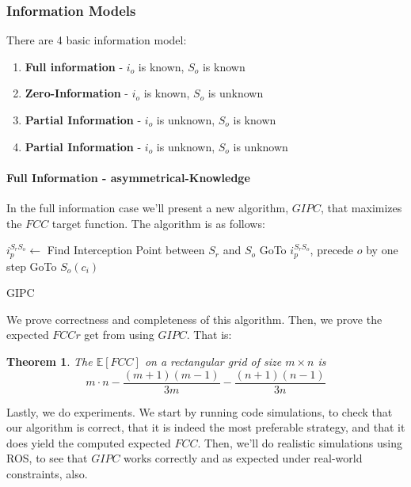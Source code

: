 \documentclass[a4paper,english,10pt]{article}
\newtheorem{theorem}{Theorem}[section]
\newcommand\rob{\ensuremath{r}\xspace}
\newcommand\opp{\ensuremath{o}\xspace}
\newcommand{\fcc}{\ensuremath{FCC}\xspace}
\begin{document}
\subsubsection{Information Models}
There are 4 basic information model: 
\begin{enumerate}
\item \textbf{Full information} - $i_\opp$ is known, $S_\opp$ is known
\item \textbf{Zero-Information} - $i_\opp$ is known, $S_\opp$ is unknown
\item \textbf{Partial Information} -  $i_\opp$ is unknown, $S_\opp$ is known
\item \textbf{Partial Information} - $i_\opp$ is unknown, $S_\opp$ is unknown
\end{enumerate}

\paragraph{Full Information - asymmetrical-Knowledge}

In the full information case we'll present a new algorithm, $GIPC$, that maximizes the \fcc target function.
The algorithm is as follows:
\begin{algorithm}
\begin{algorithmic}
	\STATE $i_p^{S_\rob S_\opp} \leftarrow $ Find Interception Point between $S_\rob$ and $S_\opp$
    \STATE GoTo $i_p^{S_\rob S_\opp}$, precede \opp by one step
    \LOOP
        	\STATE GoTo $S_\opp(c_i)$
        \ENDIF
    \ENDLOOP
  
\end{algorithmic}
\caption{GIPC\label{lss}}
\end{algorithm}

We prove correctness and completeness of this algorithm. Then, we prove the expected \fcc \rob get from using $GIPC$. That is:
\begin{theorem}
The $\mathbb{E}[\fcc]$ on a rectangular grid of size $m\times n$ is \[m\cdot n-\frac{\left(m+1\right)\left(m-1\right)}{3m}-\frac{\left(n+1\right)\left(n-1\right)}{3n}\] 
\end{theorem}

Lastly, we do experiments. We start by running code simulations, to check that our algorithm is correct, that it is indeed the most preferable strategy, and that it does yield the computed expected \fcc.
Then, we'll do realistic simulations using ROS, to see that $GIPC$ works correctly and as expected under real-world constraints, also.
\end{document}
